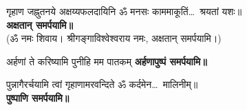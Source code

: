 \begin{center}

{गृहाण जह्नुतनये अक्षय्यफलदायिनि}
ॐ मनसः काममाकूतिं\ldots\ श्रयतां यशः॥\\
\textbf{\devAya{} अक्षतान् समर्पयामि॥}\\
(ॐ नमः शिवाय। श्रीगङ्गाविश्वेश्वराय नमः, अक्षतान् समर्पयामि।)


{अर्हणां ते करिष्यामि पुनीहि मम पातकम्}
\textbf{\devAya{} अर्हणापुष्पं समर्पयामि॥}

{पुन्नागैरर्चयामि त्वां गृहाणामरवन्दिते}
ॐ कर्दमेन\ldots\ मालिनीम्॥\\
\textbf{\devAya{} पुष्पाणि समर्पयामि॥}

\end{center}


